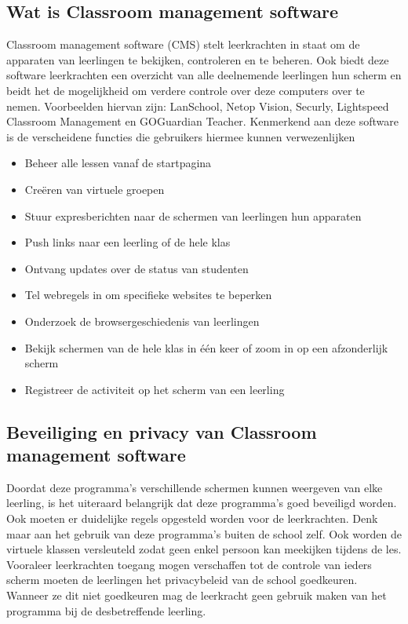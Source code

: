 \subsection{Wat is Classroom management software}
Classroom management software (CMS) stelt leerkrachten in staat om de apparaten van leerlingen te bekijken, controleren en te beheren. Ook biedt deze software leerkrachten een overzicht van alle deelnemende leerlingen hun scherm en beidt het de mogelijkheid om verdere controle over deze computers over te nemen. \autocite{brioso2017classroom}
Voorbeelden hiervan zijn: LanSchool, Netop Vision, Securly, Lightspeed Classroom Management en GOGuardian Teacher. 
Kenmerkend aan deze software is de verscheidene functies die gebruikers hiermee kunnen verwezenlijken
\begin{itemize}
    \item Beheer alle lessen vanaf de startpagina
    \item Creëren van virtuele groepen 
    \item Stuur expresberichten naar de schermen van leerlingen hun apparaten 
    \item Push links naar een leerling of de hele klas
    \item Ontvang updates over de status van studenten 
    \item Tel webregels in om specifieke websites te beperken
    \item Onderzoek de browsergeschiedenis van leerlingen 
    \item Bekijk schermen van de hele klas in één keer of zoom in op een afzonderlijk scherm
    \item Registreer de activiteit op het scherm van een leerling
    \newline
    \autocite{Lightspeed}
\end{itemize}

\subsection{Beveiliging en privacy van Classroom management software}
Doordat deze programma's verschillende schermen kunnen weergeven van elke leerling, is het uiteraard belangrijk dat deze programma's goed beveiligd worden. Ook moeten er duidelijke regels opgesteld worden voor de leerkrachten. Denk maar aan het gebruik van deze programma's buiten de school zelf. Ook worden de virtuele klassen versleuteld zodat geen enkel persoon kan meekijken tijdens de les. Vooraleer leerkrachten toegang mogen verschaffen tot de controle van ieders scherm moeten de leerlingen het privacybeleid van de school goedkeuren. Wanneer ze dit niet goedkeuren mag de leerkracht geen gebruik maken van het programma bij de desbetreffende leerling. \autocite{privacy}


